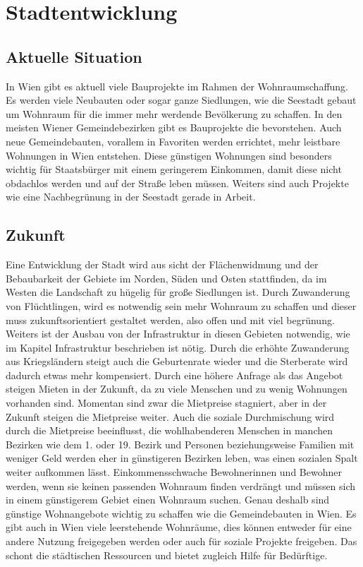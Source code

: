 \section{Stadtentwicklung}

\subsection{Aktuelle Situation}

In Wien gibt es aktuell viele Bauprojekte im Rahmen der Wohnraumschaffung. Es werden viele Neubauten oder sogar ganze Siedlungen, wie die Seestadt gebaut um Wohnraum für die immer mehr werdende Bevölkerung zu schaffen. In den meisten Wiener Gemeindebezirken gibt es Bauprojekte die bevorstehen. Auch neue Gemeindebauten, vorallem in Favoriten werden errichtet, mehr leistbare Wohnungen in Wien entstehen. Diese günstigen Wohnungen sind besonders wichtig für Staatsbürger mit einem geringerem Einkommen, damit diese nicht obdachlos werden und auf der Straße leben müssen.  Weiters sind auch Projekte wie eine Nachbegrünung in der Seestadt gerade in Arbeit. 

\subsection{Zukunft}

Eine Entwicklung der Stadt wird aus sicht der Flächenwidmung und der Bebaubarkeit der Gebiete im Norden, Süden und Osten stattfinden, da im Westen die Landschaft zu hügelig für große Siedlungen ist. Durch Zuwanderung von Flüchtlingen, wird es notwendig sein mehr Wohnraum zu schaffen und dieser muss zukunftsorientiert gestaltet werden, also offen und mit viel begrünung. Weiters ist der Ausbau von der Infrastruktur in diesen Gebieten notwendig, wie im Kapitel Infrastruktur beschrieben ist nötig. Durch die erhöhte Zuwanderung aus Kriegsländern steigt auch die Geburtenrate wieder und die Sterberate wird dadurch etwas mehr kompensiert. Durch eine höhere Anfrage als das Angebot steigen Mieten in der Zukunft, da zu viele Menschen und zu wenig Wohnungen vorhanden sind. Momentan sind zwar die Mietpreise stagniert, aber in der Zukunft steigen die Mietpreise weiter. Auch die soziale Durchmischung wird durch die Mietpreise beeinflusst, die wohlhabenderen Menschen in manchen Bezirken wie dem 1. oder 19. Bezirk und Personen beziehungsweise Familien mit weniger Geld werden eher in günstigeren Bezirken leben, was einen sozialen Spalt weiter aufkommen lässt. Einkommensschwache Bewohnerinnen und Bewohner werden, wenn sie keinen passenden Wohnraum finden verdrängt und müssen sich in einem günstigerem Gebiet einen Wohnraum suchen. Genau deshalb sind günstige Wohnangebote wichtig zu schaffen wie die Gemeindebauten in Wien.
Es gibt auch in Wien viele leerstehende Wohnräume, dies können entweder für eine andere Nutzung freigegeben werden oder auch für soziale Projekte freigeben. Das schont die städtischen Ressourcen und bietet zugleich Hilfe für Bedürftige.

